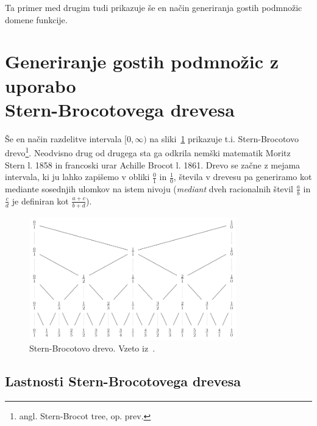 \documentclass[a4paper, 12pt, titlepage]{article}
\begin{document}
Ta primer med drugim tudi prikazuje še en način generiranja gostih podmnožic domene funkcije.

\section[Generiranje gostih podmnožic z uporabo Stern-Brocotovega drevesa]{Generiranje gostih podmnožic z uporabo\\ Stern-Brocotovega drevesa }

Še en način razdelitve intervala $ [0, \infty) $ na sliki~\ref{stern-brocot_tree} prikazuje t.i. Stern-Brocotovo drevo\footnote{angl. Stern-Brocot tree, op. prev.}. Neodvisno drug od drugega sta ga odkrila nemški matematik Moritz Stern l. 1858 in francoski urar Achille Brocot l. 1861. Drevo se začne z mejama intervala, ki ju lahko zapišemo v obliki $ \frac{0}{1}$ in $ \frac{1}{0} $, števila v drevesu pa generiramo kot mediante sosednjih ulomkov na istem nivoju (\emph{mediant} dveh racionalnih števil $ \frac{a}{b} $ in $ \frac{c}{d} $ je definiran kot $ \frac{a+c}{b+d} $).

\begin{figure}[h!]
    \centering
    \includegraphics[width=0.8\textwidth]{slike/stern-brocot_tree.png}
    \caption{Stern-Brocotovo drevo. Vzeto iz~\cite{osnovni_clanek}.}
    \label{stern-brocot_tree}
\end{figure}

\subsection{Lastnosti Stern-Brocotovega drevesa}
\end{document}
